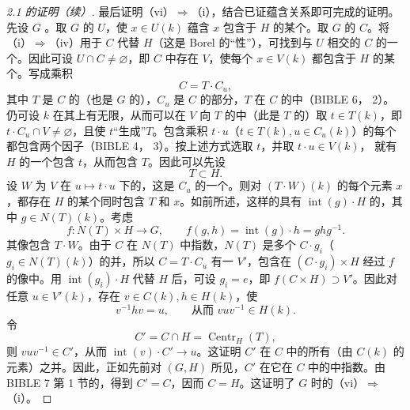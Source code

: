 \begin{proof}[ 2.1 的证明（续）]
最后证明（vi）$\Rightarrow$（i），结合已证蕴含关系即可完成的证明。先设 $G$ 。取 $G$ 的 $U$，使 $x\in U(k)$ 蕴含 $x$ 包含于 $H$ 的某个。取 $G$ 的 $C$。将（i）$\Rightarrow$（iv）用于 $C$ 代替 $H$（这是 Borel 的“性”），可找到与 $U$ 相交的 $C$ 的一个。因此可设 $U\cap C\ne\varnothing$，即 $C$ 中存在 $V$，使每个 $x\in V(k)$ 都包含于 $H$ 的某个。写成乘积
\[C=T\cdot C_u,\]
其中 $T$ 是 $C$ 的（也是 $G$ 的），$C_u$ 是 $C$ 的部分，$T$ 在 $C$ 的中（BIBLE 6， 2）。仍可设 $k$ 在其上有无限，从而可以在 $V$ 向 $T$ 的中（此是 $T$ 的）取 $t\in T(k)$，即 $t\cdot C_u\cap V\ne\varnothing$，且使 $t$“生成”$T$。包含乘积 $t\cdot u$（$t\in T(k),u\in C_u(k)$）的每个都包含两个因子（BIBLE 4， 3）。按上述方式选取 $t$，并取 $t\cdot u\in V(k)$，
就有 $H$ 的一个包含 $t$，从而包含 $T$。因此可以先设
\[T\subset H.\]
设 $W$ 为 $V$ 在 $u\mapsto t\cdot u$ 下的，这是 $C_u$ 的一个。则对 $(T\cdot W)(k)$ 的每个元素 $x$，都存在 $H$ 的某个同时包含 $T$ 和 $x$。如前所述，这样的具有 $\operatorname{int}(g)\cdot H$ 的，其中 $g\in N(T)(k)$。考虑
\[f:N(T)\times H\longrightarrow G,\qquad f(g,h)=\operatorname{int}(g)\cdot h=ghg^{-1}.\]
其像包含 $T\cdot W$。由于 $C$ 在 $N(T)$ 中指数，$N(T)$ 是多个 $C\cdot g_i$（$g_i\in N(T)(k)$）的并，所以 $C=T\cdot C_u$ 有一 $V'$，包含在 $(C\cdot g_i)\times H$ 经过 $f$ 的像中。用 $\operatorname{int}(g_i)\cdot H$ 代替 $H$ 后，可设 $g_i=e$，即 $f(C\times H)\supset V'$。因此对任意 $u\in V'(k)$，存在 $v\in C(k),h\in H(k)$，使
\[v^{-1}hv=u,\qquad\text{从而 }vuv^{-1}\in H(k).\]
令
\[C'=C\cap H=\operatorname{Centr}_H(T),\]
则 $vuv^{-1}\in C'$，从而 $\operatorname{int}(v)\cdot C'\to u$。这证明 $C'$ 在 $C$ 中的所有（由 $C(k)$ 的元素）之并。因此，正如先前对 $(G,H)$ 所见，$C'$ 在它在 $C$ 中的中指数。由 BIBLE 7 第 1 节的，得到 $C'=C$，因而 $C=H$。这证明了 $G$ 时的（vi）$\Rightarrow$（i）。


\end{proof}
